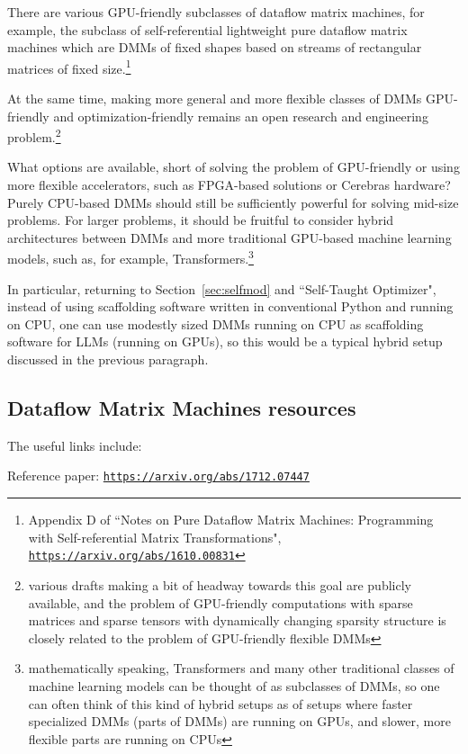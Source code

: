 \documentclass{article}
\begin{document}
There are various GPU-friendly subclasses of dataflow matrix machines, for example, the subclass of self-referential
lightweight pure dataflow matrix machines which are DMMs of fixed shapes based on streams of
rectangular matrices of fixed size.\footnote{Appendix D of ``Notes on Pure Dataflow Matrix Machines: Programming with Self-referential Matrix Transformations", \href{https://arxiv.org/abs/1610.00831}{\tt https://arxiv.org/abs/1610.00831}}

At the same time, making more general and more flexible classes of DMMs GPU-friendly and optimization-friendly
remains an open research and engineering problem.\footnote{various drafts making a bit of headway towards
this goal are publicly available, and the problem of GPU-friendly computations with sparse matrices and sparse tensors
with dynamically changing sparsity structure is closely related to the problem of GPU-friendly flexible DMMs}

What options are available, short of solving the problem of GPU-friendly or using more flexible accelerators, such
as FPGA-based solutions or Cerebras hardware? Purely CPU-based DMMs should still be sufficiently powerful for
solving mid-size problems. For larger problems, it should be fruitful to consider hybrid architectures between
DMMs and more traditional GPU-based machine learning models, such as, for example, Transformers.\footnote{mathematically
speaking, Transformers and many other traditional classes of machine learning models can be thought of
as subclasses of DMMs, so one can often think of this kind of hybrid setups as of setups where faster
specialized DMMs (parts of DMMs) are running on GPUs, and slower, more flexible parts are running on
CPUs}

In particular, returning to Section~\ref{sec:selfmod} and ``Self-Taught Optimizer", instead of using
scaffolding software written in conventional Python and running on CPU, one can use modestly sized DMMs
running on CPU as scaffolding software for LLMs (running on GPUs), so this would be a typical hybrid setup discussed
in the previous paragraph. 

\subsection{Dataflow Matrix Machines resources}

The useful links include:

Reference paper: \href{https://arxiv.org/abs/1712.07447}{\tt https://arxiv.org/abs/1712.07447}
\end{document}
